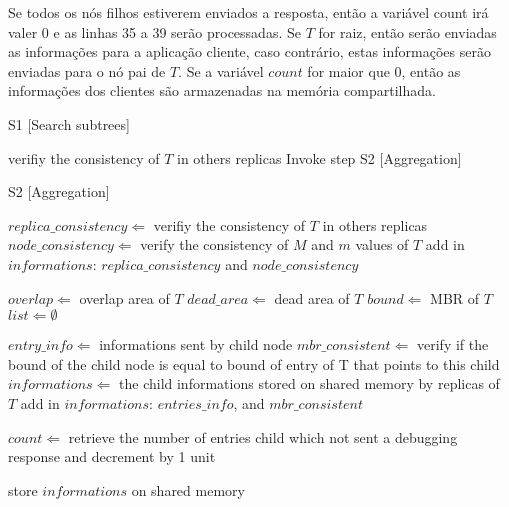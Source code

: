 	Se todos os nós filhos estiverem enviados a resposta, então a variável count irá valer 0 e as linhas 35 a 39 serão processadas. Se $T$ for raiz, então serão enviadas as informações para a aplicação cliente, caso contrário, estas informações serão enviadas para o nó pai de $T$. Se a variável $count$ for maior que 0, então as informações dos clientes são armazenadas na memória compartilhada.

\medskip
\begin{center}
\begin{minipage}{1\textwidth}
\begin{algorithm2e}[H]
\SetAlFnt{\small\sf}
 \DontPrintSemicolon
 \LinesNumbered
\SetAlgoLined
 \BlankLine
 \BlankLine
	
 S1 [Search subtrees]

{
  verifiy the consistency of $T$ in others replicas\;
	Invoke step S2 [Aggregation]\;
}

S2 [Aggregation]

$replica\_consistency \Leftarrow$ verifiy the consistency of $T$ in others replicas\;
$node\_consistency \Leftarrow$	verify the consistency of $M$ and $m$ values of  $T$\;
add in $informations$: $replica\_consistency$ and $node\_consistency$\;

$overlap \Leftarrow$ overlap area of $T$\;
$dead\_area \Leftarrow$ dead area of $T$\;
$bound \Leftarrow$ MBR of $T$\;
$list \Leftarrow \emptyset$\;


{
	  $entry\_info \Leftarrow$ informations sent by child node\;
    $mbr\_consistent \Leftarrow$ verify if the bound of the child node is equal to bound of entry of T that points to this child\;
		$informations \Leftarrow$ the child informations stored on shared memory by replicas of $T$\;
    add in $informations$: $entries\_info$, and $mbr\_consistent$\;
		
		$count \Leftarrow$ retrieve the number of entries child which not sent a debugging response and decrement by 1 unit\;
		
		{
			store $informations$ on shared memory\;
		}
            
}
\caption{$RDebug(T)$ 
\label {alg:rdebug}}
\end{algorithm2e}
\end{minipage}
\end{center}

